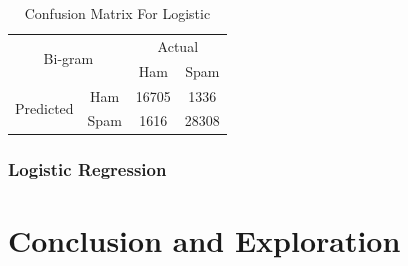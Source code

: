 \documentclass[12pt]{article}
\begin{document}
\begin{table}[H]
\begin{floatrow}
{\begin{subtable}{.45\textwidth}
								\begin{tabular}{@{}|c|c|c|c|@{}}
										\toprule
										\multicolumn{2}{|c|}{\multirow{2}{*}{Bi-gram}} & \multicolumn{2}{c|}{Actual} \\ \cmidrule(l){3-4} 
										\multicolumn{2}{|c|}{}                        & Ham          & Spam         \\ \midrule
										\multirow{2}{*}{Predicted}       & Ham        & 16705        & 1336          \\ \cmidrule(l){2-4} 
										& Spam       & 1616          & 28308        \\ \bottomrule
									\end{tabular}
							\end{subtable}
					}{  
						\caption{Confusion Matrix For Logistic}  
						\label{Confusion_Logistic}  
					}  
			\end{floatrow}
	\end{table} 



\subsubsection{Logistic Regression}



\section{Conclusion and Exploration}




\end{document}
